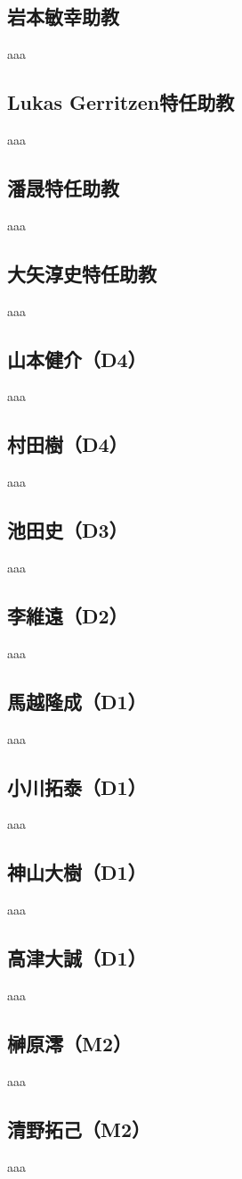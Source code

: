 \subsection{岩本敏幸助教}
aaa
\subsection{Lukas Gerritzen特任助教}
aaa
\subsection{潘晟特任助教}
aaa
\subsection{大矢淳史特任助教}
aaa
\subsection{山本健介（D4）}
aaa
\subsection{村田樹（D4）}
aaa
\subsection{池田史（D3）}
aaa
\subsection{李維遠（D2）}
aaa
\subsection{馬越隆成（D1）}
aaa
\subsection{小川拓泰（D1）}
aaa
\subsection{神山大樹（D1）}
aaa
\subsection{高津大誠（D1）}
aaa
\subsection{榊原澪（M2）}
aaa
\subsection{清野拓己（M2）}
aaa


